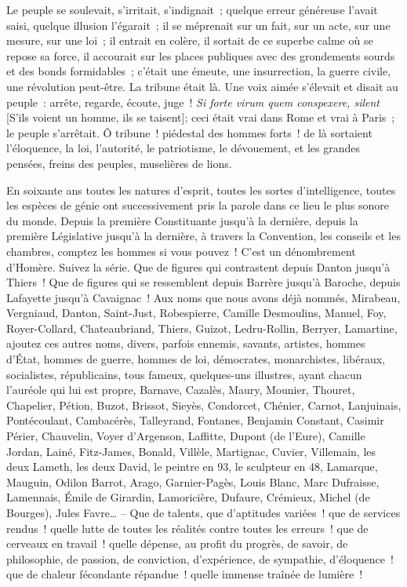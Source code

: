 \documentclass[french,twoside]{book} %
\begin{document}
Le peuple se soulevait, s’irritait, s’indignait ; quelque erreur généreuse l’avait saisi, quelque illusion l’égarait ; il se méprenait sur un fait, sur un acte, sur une mesure, sur une loi ; il entrait en colère, il sortait de ce superbe calme où se repose sa force, il accourait sur les places publiques avec des grondements sourds et des bonds formidables ; c’était une émeute, une insurrection, la guerre civile, une révolution peut-être. La tribune était là. Une voix aimée s’élevait et disait au peuple : arrête, regarde, écoute, juge ! \emph{Si forte virum quem conspexere, silent} [S’ils voient un homme, ils se taisent]; ceci était vrai dans Rome et vrai à Paris ; le peuple s’arrêtait. Ô tribune ! piédestal des hommes forts ! de là sortaient l’éloquence, la loi, l’autorité, le patriotisme, le dévouement, et les grandes pensées, freins des peuples, muselières de lions.\par
En soixante ans toutes les natures d’esprit, toutes les sortes d’intelligence, toutes les espèces de génie ont successivement pris la parole dans ce lieu le plus sonore du monde. Depuis la première Constituante jusqu’à la dernière, depuis la première Législative jusqu’à la dernière, à travers la Convention, les conseils et les chambres, comptez les hommes si vous pouvez ! C’est un dénombrement d’Homère. Suivez la série. Que de figures qui contrastent depuis Danton jusqu’à Thiers ! Que de figures qui se ressemblent depuis Barrère jusqu’à Baroche, depuis Lafayette jusqu’à Cavaignac ! Aux noms que nous avons déjà nommés, Mirabeau, Vergniaud, Danton, Saint-Just, Robespierre, Camille Desmoulins, Manuel, Foy, Royer-Collard, Chateaubriand, Thiers, Guizot, Ledru-Rollin, Berryer, Lamartine, ajoutez ces autres noms, divers, parfois ennemis, savants, artistes, hommes d’État, hommes de guerre, hommes de loi, démocrates, monarchistes, libéraux, socialistes, républicains, tous fameux, quelques-uns illustres, ayant chacun l’auréole qui lui est propre, Barnave, Cazalès, Maury, Mounier, Thouret, Chapelier, Pétion, Buzot, Brissot, Sieyès, Condorcet, Chénier, Carnot, Lanjuinais, Pontécoulant, Cambacérès, Talleyrand, Fontanes, Benjamin Constant, Casimir Périer, Chauvelin, Voyer d’Argenson, Laffitte, Dupont (de l’Eure), Camille Jordan, Lainé, Fitz-James, Bonald, Villèle, Martignac, Cuvier, Villemain, les deux Lameth, les deux David, le peintre en 93, le sculpteur en 48, Lamarque, Mauguin, Odilon Barrot, Arago, Garnier-Pagès, Louis Blanc, Marc Dufraisse, Lamennais, Émile de Girardin, Lamoricière, Dufaure, Crémieux, Michel (de Bourges), Jules Favre… – Que de talents, que d’aptitudes variées ! que de services rendus ! quelle lutte de toutes les réalités contre toutes les erreurs ! que de cerveaux en travail ! quelle dépense, au profit du progrès, de savoir, de philosophie, de passion, de conviction, d’expérience, de sympathie, d’éloquence ! que de chaleur fécondante répandue ! quelle immense traînée de lumière !\par
\end{document}
